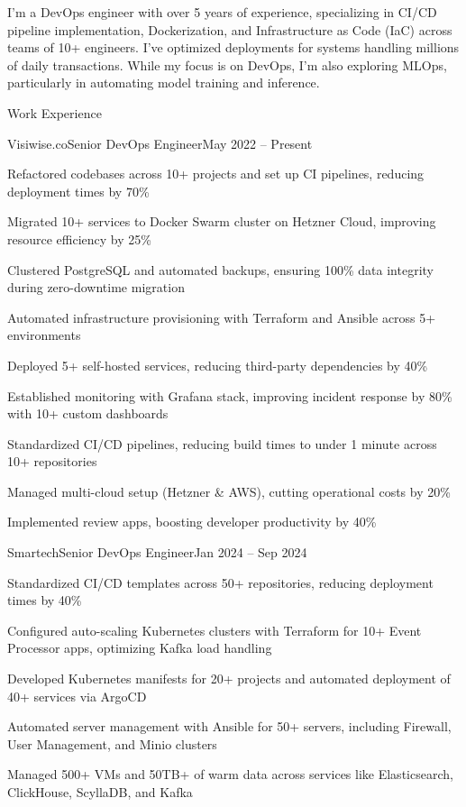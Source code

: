 \documentclass[]{main}
\begin{document}
\resumeheader
{}
{}
{}
{}
{}
{}

I'm a DevOps engineer with over 5 years of experience, specializing in CI/CD pipeline implementation, Dockerization, and Infrastructure as Code (IaC) across teams of 10+ engineers. I've optimized deployments for systems handling millions of daily transactions. While my focus is on DevOps, I'm also exploring MLOps, particularly in automating model training and inference.

\begin{section}{Work Experience}
 \begin{subsection}{Visiwise.co}{Senior DevOps Engineer}{May 2022 -- Present}{}
     \item Refactored codebases across 10+ projects and set up CI pipelines, reducing deployment times by 70\%
     \item Migrated 10+ services to Docker Swarm cluster on Hetzner Cloud, improving resource efficiency by 25\%
     \item Clustered PostgreSQL and automated backups, ensuring 100\% data integrity during zero-downtime migration
     \item Automated infrastructure provisioning with Terraform and Ansible across 5+ environments
     \item Deployed 5+ self-hosted services, reducing third-party dependencies by 40\%
     \item Established monitoring with Grafana stack, improving incident response by 80\% with 10+ custom dashboards
     \item Standardized CI/CD pipelines, reducing build times to under 1 minute across 10+ repositories
     \item Managed multi-cloud setup (Hetzner \& AWS), cutting operational costs by 20\%
     \item Implemented review apps, boosting developer productivity by 40\%
 \end{subsection}

 \begin{subsection}{Smartech}{Senior DevOps Engineer}{Jan 2024 -- Sep 2024}{}
     \item Standardized CI/CD templates across 50+ repositories, reducing deployment times by 40\%
     \item Configured auto-scaling Kubernetes clusters with Terraform for 10+ Event Processor apps, optimizing Kafka load handling
     \item Developed Kubernetes manifests for 20+ projects and automated deployment of 40+ services via ArgoCD
     \item Automated server management with Ansible for 50+ servers, including Firewall, User Management, and Minio clusters
     \item Managed 500+ VMs and 50TB+ of warm data across services like Elasticsearch, ClickHouse, ScyllaDB, and Kafka
 \end{subsection}


\end{section}
\end{document}
